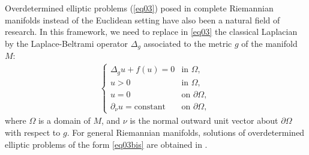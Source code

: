 \documentclass[reqno]{amsart}
\numberwithin{equation}{section}
\newenvironment{key words}{\textbf{Keywords}\mbox{  }}{ }
\begin{document}

Overdetermined elliptic problems (\ref{eq03}) posed in complete Riemannian manifolds instead of the Euclidean setting have also been a natural field of research. In this framework, we need to replace in \eqref{eq03} the classical Laplacian by the Laplace-Beltrami operator $\Delta_g$ associated to the metric $g$ of the manifold $M$:
\begin{gather}\label{eq03bis}
\begin{cases}
  \Delta_g u +f(u)=0 &\mbox{in $\Omega$, } \\
  u >0 &\mbox{in $\Omega$, } \\
  u=0 &\mbox{on $\partial \Omega$, }\\
  \partial_{\nu} u=\mbox{constant} &\mbox{on $\partial \Omega$, }
  \end{cases}
\end{gather}
where $\Omega$ is a domain of $M$, and $\nu$ is the normal outward unit vector about $\partial \Omega$ with respect to $g$. For general Riemannian manifolds, solutions of overdetermined elliptic problems of the form \eqref{eq03bis} are obtained in \cite{DS15, DEP19, FMV13, MS16, PS09, S14}.

\medskip
\end{document}
